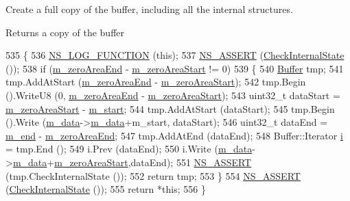 Create a full copy of the buffer, including all the internal structures. 

\begin{DoxyReturn}{Returns}
a copy of the buffer 
\end{DoxyReturn}

\begin{DoxyCode}
535 \{
536   \hyperlink{log-macros-disabled_8h_a90b90d5bad1f39cb1b64923ea94c0761}{NS\_LOG\_FUNCTION} (\textcolor{keyword}{this});
537   \hyperlink{assert_8h_a6dccdb0de9b252f60088ce281c49d052}{NS\_ASSERT} (\hyperlink{classns3_1_1Buffer_a6202ce7f1ecc1fc7a14cc13017375d14}{CheckInternalState} ());
538   \textcolor{keywordflow}{if} (\hyperlink{classns3_1_1Buffer_a50eb9a6ce5a2a75c25718edb92b8fdc0}{m\_zeroAreaEnd} - \hyperlink{classns3_1_1Buffer_ae2ebe054c3e7e2ecdfd7fcb318bf085c}{m\_zeroAreaStart} != 0) 
539     \{
540       \hyperlink{classns3_1_1Buffer_a287c877504ddcdbc244de0ca66227fda}{Buffer} tmp;
541       tmp.AddAtStart (\hyperlink{classns3_1_1Buffer_a50eb9a6ce5a2a75c25718edb92b8fdc0}{m\_zeroAreaEnd} - \hyperlink{classns3_1_1Buffer_ae2ebe054c3e7e2ecdfd7fcb318bf085c}{m\_zeroAreaStart});
542       tmp.Begin ().WriteU8 (0, \hyperlink{classns3_1_1Buffer_a50eb9a6ce5a2a75c25718edb92b8fdc0}{m\_zeroAreaEnd} - \hyperlink{classns3_1_1Buffer_ae2ebe054c3e7e2ecdfd7fcb318bf085c}{m\_zeroAreaStart});
543       uint32\_t dataStart = \hyperlink{classns3_1_1Buffer_ae2ebe054c3e7e2ecdfd7fcb318bf085c}{m\_zeroAreaStart} - \hyperlink{classns3_1_1Buffer_afbea962435250b6a0a6c860c50b75386}{m\_start};
544       tmp.AddAtStart (dataStart);
545       tmp.Begin ().Write (\hyperlink{classns3_1_1Buffer_aad1ff41b0403829d7aadfef80783484d}{m\_data}->\hyperlink{structns3_1_1Buffer_1_1Data_a29e7d0a3b4e7e8272d06eb8c8e51ed04}{m\_data}+m\_start, dataStart);
546       uint32\_t dataEnd = \hyperlink{classns3_1_1Buffer_a1f83bdf72c64ddd2a2e862b64236f29d}{m\_end} - \hyperlink{classns3_1_1Buffer_a50eb9a6ce5a2a75c25718edb92b8fdc0}{m\_zeroAreaEnd};
547       tmp.AddAtEnd (dataEnd);
548       Buffer::Iterator \hyperlink{bernuolliDistribution_8m_a6f6ccfcf58b31cb6412107d9d5281426}{i} = tmp.End ();
549       i.Prev (dataEnd);
550       i.Write (\hyperlink{classns3_1_1Buffer_aad1ff41b0403829d7aadfef80783484d}{m\_data}->\hyperlink{structns3_1_1Buffer_1_1Data_a29e7d0a3b4e7e8272d06eb8c8e51ed04}{m\_data}+\hyperlink{classns3_1_1Buffer_ae2ebe054c3e7e2ecdfd7fcb318bf085c}{m\_zeroAreaStart},dataEnd);
551       \hyperlink{assert_8h_a6dccdb0de9b252f60088ce281c49d052}{NS\_ASSERT} (tmp.CheckInternalState ());
552       \textcolor{keywordflow}{return} tmp;
553     \}
554   \hyperlink{assert_8h_a6dccdb0de9b252f60088ce281c49d052}{NS\_ASSERT} (\hyperlink{classns3_1_1Buffer_a6202ce7f1ecc1fc7a14cc13017375d14}{CheckInternalState} ());
555   \textcolor{keywordflow}{return} *\textcolor{keyword}{this};
556 \}
\end{DoxyCode}


